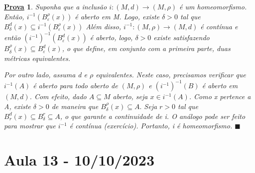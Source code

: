 \documentclass{article}
\newtheorem*{proof*}{\underline{Prova}}
\renewcommand\qedsymbol{$\blacksquare$}
\begin{document}
\begin{proof*}
  Suponha que a inclusão \(i:(M, d)\rightarrow (M, \rho )\) é um homeomorfismo. Então, 
\(i^{-1}(B_{\varepsilon }^{\rho }(x))\) é aberto em M. Logo, existe \(\delta > 0\) tal que 
\(B_{\delta }^{d}(x) \subseteq{i^{-1}(B_{\varepsilon }^{\rho }(x))}\)
Além disso, \(i^{-1}:(M, \rho )\rightarrow (M, d)\) é contínua e então \((i^{-1})^{-1}(B_{\varepsilon }^{d}(x))\)
é aberto, logo, \(\delta >0\) existe satisfazendo \(B_{\delta }^{\rho }(x) \subseteq{B_{\varepsilon }^{d}(x)}\), o 
que define, em conjunto com a primeira parte, duas métricas equivalentes.

  Por outro lado, assuma d e \(\rho \) equivalentes. Neste caso, precisamos verificar
que \(i^{-1}(A)\) é aberto para todo aberto de \((M, \rho) \) e \((i^{-1})^{-1}(B)\) é aberto em \((M, d)\).
Com efeito, dado \(A\subseteq{M}\) aberto, seja \(x\in i^{-1}(A)\). Como x pertence a A, existe \(\delta >0\) de
maneira que \(B_{\delta }^{\rho }(x)\subseteq{A}.\) Seja \(r > 0\) tal que \(B_{r}^{d}(x)\subseteq{B_{\delta }^{r}}\subseteq{A}\),
o que garante a continuidade de i. O análogo pode ser feito para mostrar que \(i^{-1}\) é contínua (exercício).
Portanto, i é homeomorfismo. \qedsymbol
\end{proof*}
\newpage

\section{Aula 13 - 10/10/2023}
\end{document}
